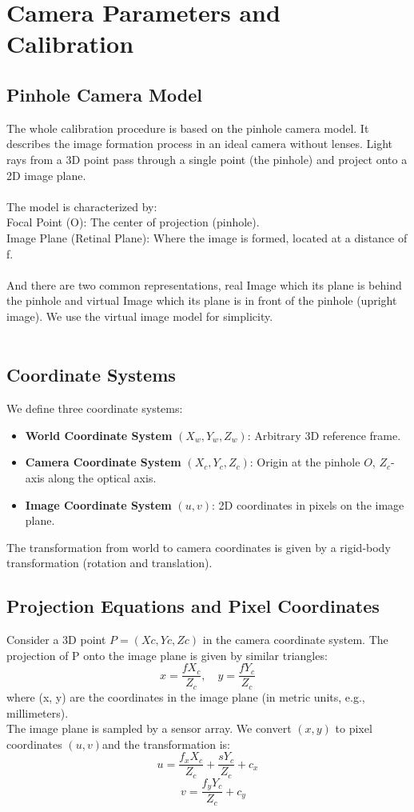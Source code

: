 \documentclass{article}
\begin{document}
\section{Camera Parameters and Calibration}
\subsection{Pinhole Camera Model}
\indent \indent The whole calibration procedure is based on the pinhole camera model. It describes the image formation process in an ideal camera without lenses. Light rays from a 3D point pass through a single point (the pinhole) and project onto a 2D image plane.\\\\
The model is characterized by:\\
Focal Point (O): The center of projection (pinhole).\\
Image Plane (Retinal Plane): Where the image is formed, located at a distance of f.\\\\
\indent And there are two common representations, real Image which its plane is behind the pinhole and virtual Image which its plane is in front of the pinhole (upright image). We use the virtual image model for simplicity.\\\\


\subsection{Coordinate Systems}
We define three coordinate systems:
\begin{itemize}
    \item \textbf{World Coordinate System} $(X_w, Y_w, Z_w)$: Arbitrary 3D reference frame.
    \item \textbf{Camera Coordinate System} $(X_c, Y_c, Z_c)$: Origin at the pinhole $O$, $Z_c$-axis along the optical axis.
    \item \textbf{Image Coordinate System} $(u, v)$: 2D coordinates in pixels on the image plane.
\end{itemize}
The transformation from world to camera coordinates is given by a rigid-body transformation (rotation and translation).



\subsection{Projection Equations and Pixel Coordinates}
Consider a 3D point $P=(Xc,Yc,Zc)$ in the camera coordinate system. The projection of P onto the image plane is given by similar triangles:
\[
x = \frac{f X_c}{Z_c}, \quad y = \frac{f Y_c}{Z_c}
\]
where (x, y) are the coordinates in the image plane (in metric units, e.g., millimeters).\\
The image plane is sampled by a sensor array. We convert $(x, y)$ to pixel coordinates $(u, v)$and the transformation is:
\[
u = \frac{f_x X_c}{Z_c} + \frac{s Y_c}{Z_c} + c_x
\]
\[
\quad v = \frac{f_y Y_c}{Z_c} + c_y
\]
\end{document}
